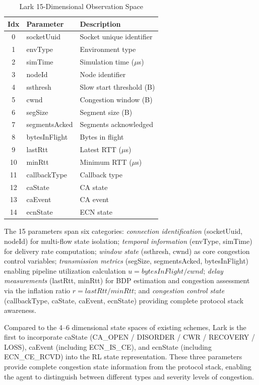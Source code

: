 \documentclass[10pt,twocolumn]{article}
\begin{document}
\begin{table}[htbp]
\centering
\caption{Lark 15-Dimensional Observation Space}
\label{tab:obs}
\small
\begin{tabular}{clp{3.2cm}}
\toprule
\textbf{Idx} & \textbf{Parameter} & \textbf{Description} \\
\midrule
0 & socketUuid & Socket unique identifier \\
1 & envType & Environment type \\
2 & simTime & Simulation time ($\mu$s) \\
3 & nodeId & Node identifier \\
4 & ssthresh & Slow start threshold (B) \\
5 & cwnd & Congestion window (B) \\
6 & segSize & Segment size (B) \\
7 & segmentsAcked & Segments acknowledged \\
8 & bytesInFlight & Bytes in flight \\
9 & lastRtt & Latest RTT ($\mu$s) \\
10 & minRtt & Minimum RTT ($\mu$s) \\
11 & callbackType & Callback type \\
12 & caState & CA state \\
13 & caEvent & CA event \\
14 & ecnState & ECN state \\
\bottomrule
\end{tabular}
\end{table}

The 15 parameters span six categories: \textit{connection identification} (socketUuid, nodeId) for multi-flow state isolation; \textit{temporal information} (envType, simTime) for delivery rate computation; \textit{window state} (ssthresh, cwnd) as core congestion control variables; \textit{transmission metrics} (segSize, segmentsAcked, bytesInFlight) enabling pipeline utilization calculation $u = bytesInFlight / cwnd$; \textit{delay measurements} (lastRtt, minRtt) for BDP estimation and congestion assessment via the inflation ratio $r = lastRtt / minRtt$; and \textit{congestion control state} (callbackType, caState, caEvent, ecnState) providing complete protocol stack awareness.

Compared to the 4--6 dimensional state spaces of existing schemes, Lark is the first to incorporate caState (CA\_OPEN / DISORDER / CWR / RECOVERY / LOSS), caEvent (including ECN\_IS\_CE), and ecnState (including ECN\_CE\_RCVD) into the RL state representation. These three parameters provide complete congestion state information from the protocol stack, enabling the agent to distinguish between different types and severity levels of congestion.
\end{document}
